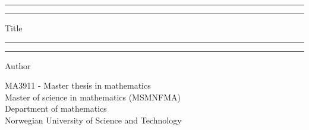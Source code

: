 \begin{titlingpage}

\vspace*{5cm}

\rule[-11pt]{\textwidth}{1pt}
\rule{\textwidth}{0.5pt}

\begin{center}
\Huge Title 
\end{center}

\rule{\textwidth}{0.5pt}
\rule[10.1pt]{\textwidth}{1pt}


\begin{center}
Author
\end{center}


\vspace{\fill}


\begin{center}
	MA3911 - Master thesis in mathematics      \\[0.4cm]
	Master of science in mathematics (MSMNFMA) \\[0.3cm]
	Department of mathematics                  \\[0.3cm]
	Norwegian University of Science and Technology
\end{center}


\end{titlingpage}